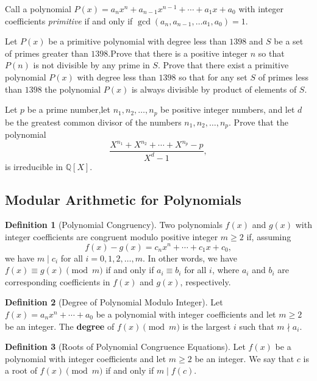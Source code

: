 \documentclass[12pt,a4paper]{memoir}
\theoremstyle{definition}
\newtheorem*{definition}{Definition}
\begin{document}
\begin{question}[name={2019 Iran Third Round}]
	Call a polynomial $P(x)=a_nx^n+a_{n-1}x^{n-1}+\cdots +a_1x+a_0$ with integer coefficients \textit{primitive} if and only if $\gcd(a_n,a_{n-1},\dots a_1,a_0) =1$.
	\begin{tasks}
		\task Let $P(x)$ be a primitive polynomial with degree less than $1398$ and $S$ be a set of primes greater than $1398$.Prove that there is a positive integer $n$ so that $P(n)$ is not divisible by any prime in $S$.
		\task Prove that there exist a primitive polynomial $P(x)$ with degree less than $1398$ so that for any set $S$ of primes less than $1398$ the polynomial $P(x)$ is always divisible by product of elements of $S$.
	\end{tasks}
\end{question}


\begin{question}[name={2010 Romania TST}]
	Let $p$ be a prime number,let $n_1, n_2, \ldots, n_p$ be positive integer numbers, and let $d$ be the greatest common divisor of the numbers $n_1, n_2, \ldots, n_p$. Prove that the polynomial
	\[\dfrac{X^{n_1} + X^{n_2} + \cdots + X^{n_p} - p}{X^d - 1},\]
	is irreducible in $\mathbb{Q}[X]$.
\end{question}

\subsection{Modular Arithmetic for Polynomials}

\begin{tcolorbox}[title={Modular Arithmetic of Polynomials}]
	\begin{definition}[Polynomial Congruency]
		Two polynomials $f(x)$ and $g(x)$ with integer coefficients are congruent modulo positive integer $m\geq 2$ if, assuming \[f(x)-g(x)=c_nx^n+\cdots+c_1x+c_0,\] we have $m\mid c_i$ for all $i=0,1,2,\dots,m$. In other words, we have $f(x) \equiv g(x) \pmod m$ if and only if $a_i \equiv b_i$ for all $i$, where $a_i$ and $b_i$ are corresponding coefficients in $f(x)$ and $g(x)$, respectively.
	\end{definition}
	
	\begin{definition}[Degree of Polynomial Modulo Integer]
		Let $f(x)=a_nx^n+\cdots+a_0$ be a polynomial with integer coefficients and let $m\geq 2$ be an integer. The \textbf{degree} of $f(x) \pmod m$ is the largest $i$ such that $m \nmid a_i$.
	\end{definition}
	
	\begin{definition}[Roots of Polynomial Congruence Equations]
		Let $f(x)$ be a polynomial with integer coefficients and let $m\geq 2$ be an integer. We say that $c$ is a root of $f(x) \pmod m$ if and only if $m \mid f(c)$.
	\end{definition}
\end{tcolorbox}
\end{document}
